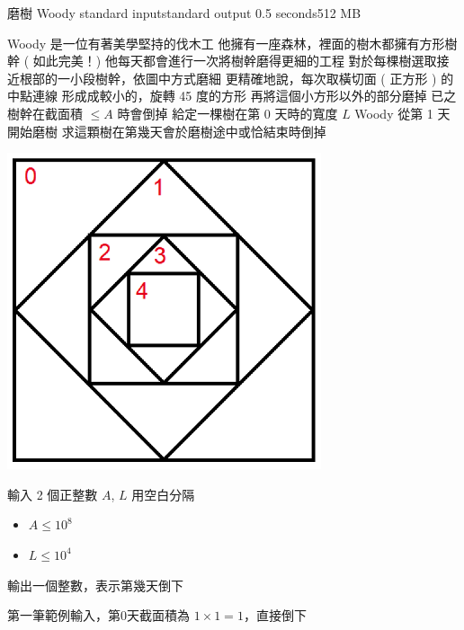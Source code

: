\gdef\thisproblemauthor{}
\gdef\thisproblemdeveloper{}
\gdef\thisproblemorigin{}
\begin{problem}{磨樹 Woody}
{standard input}{standard output}
{0.5 seconds}{512 MB}{}

Woody 是一位有著美學堅持的伐木工 \newline
他擁有一座森林，裡面的樹木都擁有方形樹幹 ( 如此完美！) \newline
他每天都會進行一次將樹幹磨得更細的工程 \newline
對於每棵樹選取接近根部的一小段樹幹，依圖中方式磨細 \newline
\newline
更精確地說，每次取橫切面 ( 正方形 ) 的中點連線 \newline
形成成較小的，旋轉 45 度的方形 \newline
再將這個小方形以外的部分磨掉 \newline
\newline
已之樹幹在截面積 $ \leq A $ 時會倒掉 \newline
給定一棵樹在第 0 天時的寬度 $ L $ \newline
Woody 從第 1 天開始磨樹 \newline
求這顆樹在第幾天會於磨樹途中或恰結束時倒掉 \newline

\centerline{\includegraphics[scale=0.8]{./pics/A.png}}

\InputFile

輸入 2 個正整數 $ A $, $ L $ \newline
用空白分隔
\begin{iofmt}
\begin{itemize}
	\item $ A \leq 10^8 $
	\item $ L \leq 10^4 $
\end{itemize}
\end{iofmt}

\OutputFile

輸出一個整數，表示第幾天倒下

\Examples

\begin{example}
%
%
%
\end{example}

第一筆範例輸入，第0天截面積為 $1 \times 1 = 1$，直接倒下

\end{problem}
